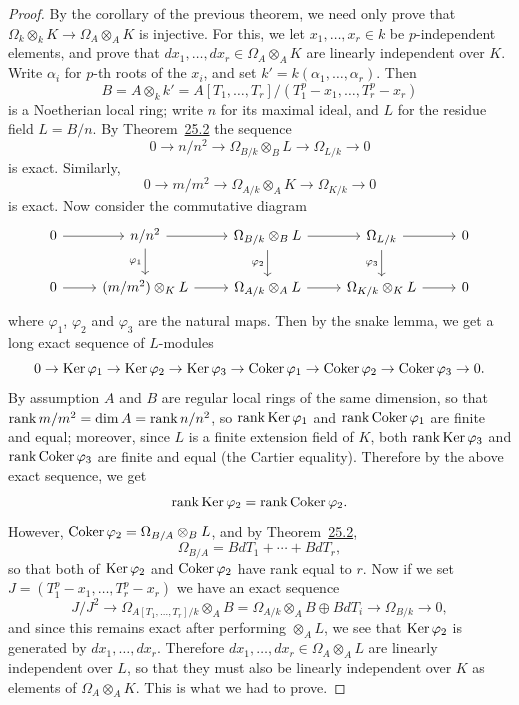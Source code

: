 \begin{proof}
By the corollary of the previous theorem, we need only prove that
$\Omega_k \otimes_k K \to \Omega_A \otimes_A K$ is injective. For this, we let
$x_1, \ldots, x_r \in k$ be $p$-independent elements, and prove that
$dx_1, \ldots, dx_r \in \Omega_A \otimes_A K$ are linearly independent over $K$. Write $\alpha_i$ for $p$-th
roots of the $x_i$, and set $k' = k(\alpha_1, \ldots, \alpha_r)$. Then
\[
  B = A \otimes_k k' = A[T_1, \ldots, T_r]/(T_1^p - x_1, \ldots, T_r^p - x_r)
\]
is a Noetherian local ring; write $n$ for its maximal ideal, and $L$ for the residue
field $L = B/n$. By Theorem~\hyperref[thm:25.2]{25.2} the sequence
\[
  0 \to n/n^2 \to \Omega_{B/k} \otimes_B L \to \Omega_{L/k} \to 0
\]
is exact. Similarly,
\[
  0 \to m/m^2 \to \Omega_{A/k} \otimes_A K \to \Omega_{K/k} \to 0
\]
is exact. Now consider the commutative diagram
\[
\begin{tikzcd}
0 \arrow[r] & n/n^2 \arrow[r] \arrow[d, "\varphi_1"'] & \Omega_{B/k} \otimes_B L \arrow[r] \arrow[d, "\varphi_2"'] & \Omega_{L/k} \arrow[r] \arrow[d, "\varphi_3"'] & 0 \\
0 \arrow[r] & (m/m^2) \otimes_K L \arrow[r] & \Omega_{A/k} \otimes_A L \arrow[r] & \Omega_{K/k} \otimes_K L \arrow[r] & 0
\end{tikzcd}
\]
where $\varphi_1$, $\varphi_2$ and $\varphi_3$ are the natural maps. Then by the snake lemma, we get a
long exact sequence of $L$-modules
\[
  0 \to \operatorname{Ker} \varphi_1 \to \operatorname{Ker} \varphi_2 \to \operatorname{Ker} \varphi_3
      \to \operatorname{Coker} \varphi_1 \to \operatorname{Coker} \varphi_2 \to \operatorname{Coker} \varphi_3 \to 0.
\]
By assumption $A$ and $B$ are regular local rings of the same dimension, so that
$\operatorname{rank} m/m^2 = \dim A = \operatorname{rank} n/n^2$, so $\operatorname{rank} \operatorname{Ker} \varphi_1$ and $\operatorname{rank} \operatorname{Coker} \varphi_1$ are
finite and equal; moreover, since $L$ is a finite extension field of $K$, both
$\operatorname{rank} \operatorname{Ker} \varphi_3$ and $\operatorname{rank} \operatorname{Coker} \varphi_3$ are finite and equal (the Cartier equality).
Therefore by the above exact sequence, we get
\[
  \operatorname{rank} \operatorname{Ker} \varphi_2 = \operatorname{rank} \operatorname{Coker} \varphi_2.
\]
However, $\operatorname{Coker} \varphi_2 = \Omega_{B/A} \otimes_B L$, and by Theorem~\hyperref[thm:25.2]{25.2},
\[
  \Omega_{B/A} = BdT_1 + \cdots + BdT_r,
\]
so that both of $\operatorname{Ker} \varphi_2$ and $\operatorname{Coker} \varphi_2$ have rank equal to $r$. Now if we set
$J = (T_1^p - x_1, \ldots, T_r^p - x_r)$ we have an exact sequence
\[
  J/J^2 \to \Omega_{A[T_1, \ldots, T_r]/k} \otimes_A B = \Omega_{A/k} \otimes_A B \oplus B dT_i \to \Omega_{B/k} \to 0,
\]
and since this remains exact after performing $\otimes_A L$, we see that $\operatorname{Ker} \varphi_2$ is
generated by $dx_1, \ldots, dx_r$. Therefore $dx_1, \ldots, dx_r \in \Omega_A \otimes_A L$ are
linearly independent over $L$, so that they must also be linearly independent
over $K$ as elements of $\Omega_A \otimes_A K$. This is what we had to prove.
\end{proof}

